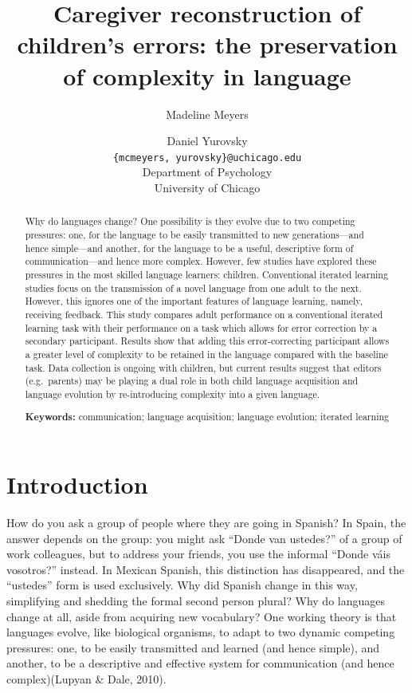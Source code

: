 \documentclass[10pt, letterpaper]{article}
\title{Caregiver reconstruction of children's errors: the preservation of
complexity in language}
\author{Madeline Meyers \and Daniel Yurovsky \\
        \texttt{\{mcmeyers, yurovsky\}@uchicago.edu} \\
       Department of Psychology \\ University of Chicago}
\begin{document}
\maketitle

\begin{abstract}
Why do languages change? One possibility is they evolve due to two
competing pressures: one, for the language to be easily transmitted to
new generations---and hence simple---and another, for the language to be
a useful, descriptive form of communication---and hence more complex.
However, few studies have explored these pressures in the most skilled
language learners: children. Conventional iterated learning studies
focus on the transmission of a novel language from one adult to the
next. However, this ignores one of the important features of language
learning, namely, receiving feedback. This study compares adult
performance on a conventional iterated learning task with their
performance on a task which allows for error correction by a secondary
participant. Results show that adding this error-correcting participant
allows a greater level of complexity to be retained in the language
compared with the baseline task. Data collection is ongoing with
children, but current results suggest that editors (e.g.~parents) may be
playing a dual role in both child language acquisition and language
evolution by re-introducing complexity into a given language.

\textbf{Keywords:}
communication; language acquisition; language evolution; iterated
learning
\end{abstract}

\hypertarget{introduction}{%
\section{Introduction}\label{introduction}}

How do you ask a group of people where they are going in Spanish? In
Spain, the answer depends on the group: you might ask ``Donde van
ustedes?'' of a group of work colleagues, but to address your friends,
you use the informal ``Donde váis vosotros?'' instead. In Mexican
Spanish, this distinction has disappeared, and the ``ustedes'' form is
used exclusively. Why did Spanish change in this way, simplifying and
shedding the formal second person plural? Why do languages change at
all, aside from acquiring new vocabulary? One working theory is that
languages evolve, like biological organisms, to adapt to two dynamic
competing pressures: one, to be easily transmitted and learned (and
hence simple), and another, to be a descriptive and effective system for
communication (and hence complex)(Lupyan \& Dale, 2010).
\end{document}
